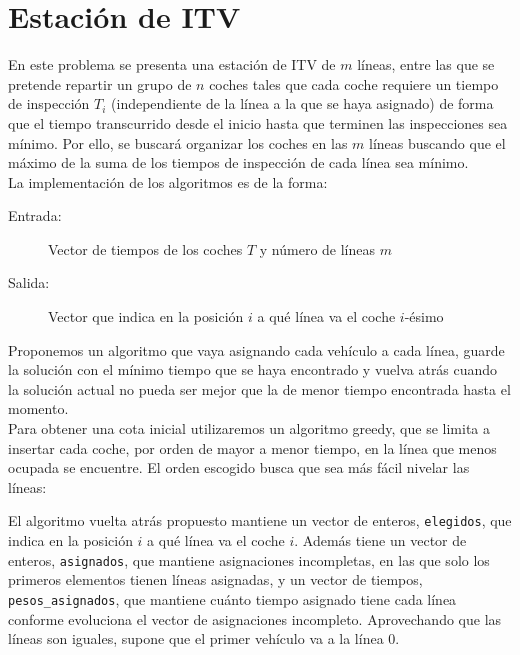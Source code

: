 \section{Estación de ITV}

En este problema se presenta una estación de ITV de $m$ líneas, entre las que
se pretende repartir un grupo de $n$ coches tales que cada coche requiere un
tiempo de inspección $T_i$ (independiente de la línea a la que se haya asignado)
de forma que el tiempo transcurrido desde el inicio hasta que terminen las
inspecciones sea mínimo. Por ello, se buscará organizar los coches en las $m$
líneas buscando que el máximo de la suma de los tiempos de inspección de cada
línea sea mínimo. \\

La implementación de los algoritmos es de la forma:
\begin{description}
\item[Entrada:] Vector de tiempos de los coches $T$ y número de líneas $m$
\item[Salida:] Vector que indica en la posición $i$ a qué línea va el coche $i$-ésimo
\end{description}

Proponemos un algoritmo que vaya asignando cada vehículo a cada línea, guarde la solución con el mínimo tiempo que se haya encontrado y vuelva atrás cuando la solución actual no pueda ser mejor que la de menor tiempo encontrada hasta el momento. \\

Para obtener una cota inicial utilizaremos un algoritmo greedy, que se limita a insertar cada coche, por orden de mayor a menor tiempo, en la línea que menos ocupada se encuentre. El orden escogido busca que sea más fácil nivelar las líneas:


El algoritmo vuelta atrás propuesto mantiene un vector de enteros, \texttt{elegidos}, que indica en la posición $i$ a qué línea va el coche $i$. Además tiene un vector de enteros, \texttt{asignados}, que mantiene asignaciones incompletas, en las que solo los primeros elementos tienen líneas asignadas, y un vector de tiempos, \texttt{pesos\_asignados}, que mantiene cuánto tiempo asignado tiene cada línea conforme evoluciona el vector de asignaciones incompleto. Aprovechando que las líneas son iguales, supone que el primer vehículo va a la línea 0.


